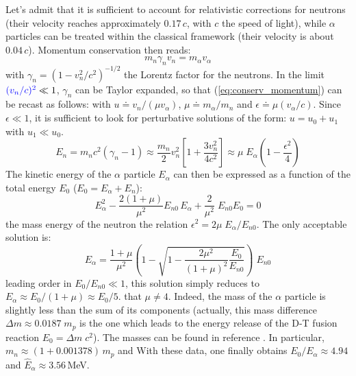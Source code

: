 \documentclass[12pt]{iopart}
\newcommand{\newstuff}[1]{\color{blue}{#1}\color{black}}
\begin{document}
Let's admit that it is sufficient to account for relativistic corrections for neutrons (their velocity reaches approximately $0.17\, c$, with $c$ the speed of light), while $\alpha$ particles can be treated within the classical framework (their velocity is about $0.04\, c$).
Momentum conservation then reads:
\begin{equation}
m_n \gamma_n v_n = m_\alpha v_\alpha
\label{eq:conserv_momentum}
\end{equation}
with $\gamma_n = (1-v_n^2/c^2)^{-1/2}$ the Lorentz factor for the neutrons. In the limit $\newstuff{(v_n/c)^2} \ll1$,  $\gamma_n$ can be Taylor expanded, so that (\ref{eq:conserv_momentum}) can be recast as follows: \newstuff{$u [ 1+(\epsilon/2)\, u^2 ] = 1$, } with $u \doteq v_n/(\mu v_\alpha)$, $\mu \doteq m_\alpha/m_n$ and $\epsilon \doteq \mu (v_\alpha/c)$. Since $\epsilon \ll1$, it is sufficient to look for perturbative solutions of the form: $ u = u_0 + u_1$ with $u_1\ll u_0 $. \newstuff{The approximate solution then reads: $v_n \simeq \mu v_\alpha ( 1-\epsilon^2/2)$. Injecting this expression in the kinetic energy of the neutron $E_n$ leads to: }
\begin{equation*}
	E_n = m_nc^2(\gamma_n-1) \approx 
	\frac{m_n}{2} v_n^2\left[ 1+ \frac{3v_n^2}{4c^2}\right] 
	\approx \mu\; E_\alpha \left( 1-\frac{\epsilon^2}{4}\right)
\end{equation*}
The kinetic energy of the $\alpha$ particle $E_\alpha$ can then be expressed as a function of the total energy $E_0$ ($E_0 =E_\alpha + E_n$):
\begin{equation}
E_\alpha^2 - \frac{2(1+\mu)}{\mu^2}E_{n0}\, E_\alpha + \frac{2}{\mu^2}\; E_{n0}E_0 = 0
\end{equation}
\newstuff{with $E_{n0} = m_nc^2$ } the mass energy of the neutron \newstuff{and using } the relation $\epsilon^2 = 2\mu\; E_\alpha/E_{n0}$. The only acceptable solution is:
\begin{equation}
E_\alpha = \frac{1+\mu}{\mu^2}
\left( 1 - \sqrt{1-\frac{2\mu^2}{(1+\mu)^2}\frac{E_0}{E_{n0}}}\right)\; E_{n0}
\end{equation}
\newstuff{At } leading order in $E_0/E_{n0}\ll1$, this solution simply reduces to $E_\alpha \approx E_0/(1+\mu) \approx E_0/5$. \newstuff{Notice } that $\mu\neq 4$. 
Indeed, the mass of the $\alpha$ particle is slightly less than the sum of its components (actually, this mass difference $\Delta m \approx 0.0187\; m_p$ is the one which leads to the energy release of the D-T fusion reaction $E_0 = \Delta m\;c^2$). The masses can be found in reference \cite{Wesson2004}. In particular, $m_n \approx (1+0.001378)\, m_p$ and \newstuff{$\mu \doteq m_\alpha/m_n \approx (1-0.027404)\; m_p /m_n \approx 3.967$. }
With these data, one finally obtains $E_0/E_\alpha \approx 4.94$ and $\widehat E_\alpha \approx 3.56\,$MeV.
\end{document}
